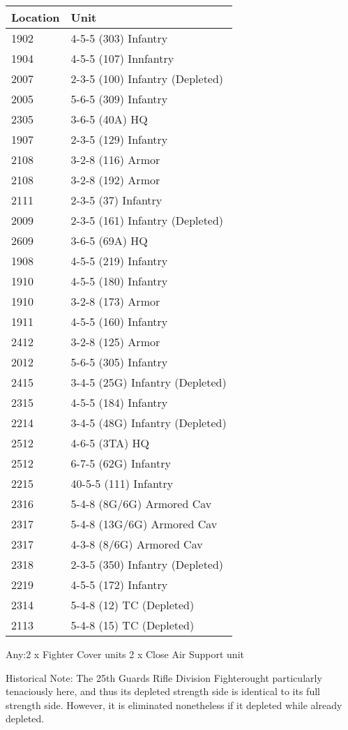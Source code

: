 \documentclass[10pt]{article}
\begin{document}
\begin{tabular}{ll}
Location & Unit \\\hline
1902 & 4-5-5 (303) Infantry \\
1904 & 4-5-5 (107) Innfantry \\
2007 & 2-3-5 (100) Infantry (Depleted) \\
2005 & 5-6-5 (309) Infantry \\
2305 & 3-6-5 (40A) HQ \\
1907 & 2-3-5 (129) Infantry \\
2108 & 3-2-8 (116) Armor \\
2108 & 3-2-8 (192) Armor \\
2111 & 2-3-5 (37)  Infantry \\
2009 & 2-3-5 (161) Infantry (Depleted) \\
2609 & 3-6-5 (69A) HQ \\
1908 & 4-5-5 (219) Infantry \\
1910 & 4-5-5 (180) Infantry \\
1910 & 3-2-8 (173) Armor \\
1911 & 4-5-5 (160) Infantry \\
2412 & 3-2-8 (125) Armor \\
2012 & 5-6-5 (305) Infantry \\
2415 & 3-4-5 (25G) Infantry (Depleted) \\
2315 & 4-5-5 (184) Infantry \\
2214 & 3-4-5 (48G) Infantry (Depleted) \\
2512 & 4-6-5 (3TA) HQ \\
2512 & 6-7-5 (62G) Infantry \\
2215 & 40-5-5 (111) Infantry \\
2316 & 5-4-8 (8G/6G) Armored Cav \\
2317 & 5-4-8 (13G/6G) Armored Cav  \\
2317 & 4-3-8 (8/6G) Armored Cav \\
2318 & 2-3-5 (350) Infantry (Depleted) \\
2219 & 4-5-5 (172) Infantry \\
2314 & 5-4-8 (12) TC (Depleted) \\
2113 & 5-4-8 (15) TC (Depleted) \\\hline
\end{tabular}

Any:2 x Fighter Cover units
2 x Close Air Support unit

Historical Note: The 25th Guards Rifle Division Fighterought particularly
tenaciously here, and thus its depleted strength side is identical to its full
strength side. However, it is eliminated nonetheless if it depleted while
already depleted.
\end{document}
